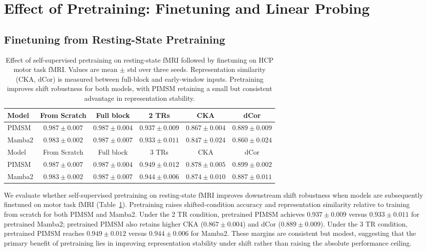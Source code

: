 \documentclass{article}
\begin{document}
\section{Effect of Pretraining: Finetuning and Linear Probing}
\label{sec:appx:pretrain}

\subsection{Finetuning from Resting-State Pretraining}

\begin{table}[htbp]
\centering
\footnotesize
\begin{tabular}{lccccc}
\toprule
Model & From Scratch & Full block & 2 TRs & CKA & dCor \\
\midrule
PIMSM & $0.987 \pm 0.007$ & $0.987 \pm 0.004$ & $\mathbf{0.937 \pm 0.009}$ & $\mathbf{0.867 \pm 0.004}$ & $\mathbf{0.889 \pm 0.009}$ \\
Mamba2 & $0.983 \pm 0.002$ & $0.987 \pm 0.007$ & $0.933 \pm 0.011$ & $0.847 \pm 0.024$ & $0.860 \pm 0.024$ \\
\midrule
Model & From Scratch & Full block & 3 TRs & CKA & dCor \\
\midrule
PIMSM & $0.987 \pm 0.007$ & $0.987 \pm 0.004$ & $\mathbf{0.949 \pm 0.012}$ & $\mathbf{0.878 \pm 0.005}$ & $\mathbf{0.899 \pm 0.002}$ \\
Mamba2 & $0.983 \pm 0.002$ & $0.987 \pm 0.007$ & $0.944 \pm 0.006$ & $0.874 \pm 0.010$ & $0.887 \pm 0.011$ \\
\bottomrule
\end{tabular}
\caption{
Effect of self-supervised pretraining on resting-state fMRI followed by finetuning on HCP motor task fMRI.
Values are mean $\pm$ std over three seeds.
Representation similarity (CKA, dCor) is measured between full-block and early-window inputs.
Pretraining improves shift robustness for both models, with PIMSM retaining a small but consistent advantage in representation stability.
}
\label{tab:pretrain_finetune}
\end{table}

We evaluate whether self-supervised pretraining on resting-state fMRI improves downstream shift robustness when models are subsequently finetuned on motor task fMRI (Table~\ref{tab:pretrain_finetune}).
Pretraining raises shifted-condition accuracy and representation similarity relative to training from scratch for both PIMSM and Mamba2.
Under the 2 TR condition, pretrained PIMSM achieves $0.937 \pm 0.009$ versus $0.933 \pm 0.011$ for pretrained Mamba2; pretrained PIMSM also retains higher CKA ($0.867 \pm 0.004$) and dCor ($0.889 \pm 0.009$).
Under the 3 TR condition, pretrained PIMSM reaches $0.949 \pm 0.012$ versus $0.944 \pm 0.006$ for Mamba2.
These margins are consistent but modest, suggesting that the primary benefit of pretraining lies in improving representation stability under shift rather than raising the absolute performance ceiling.
\end{document}
